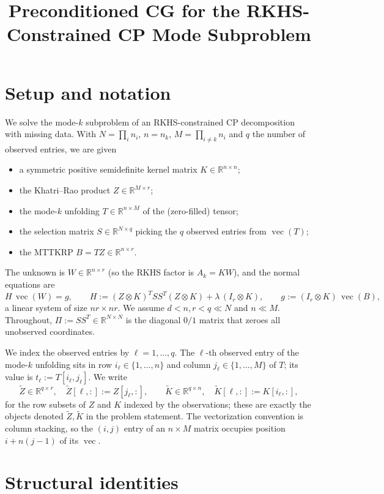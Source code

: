 \documentclass[12pt]{article}
\title{Preconditioned CG for the RKHS-Constrained CP Mode Subproblem}
\author{}
\date{}
\DeclareMathOperator{\vecop}{vec}
\newcommand{\bR}{\mathbb{R}}
\newcommand{\tZ}{\tilde Z}
\newcommand{\tK}{\tilde K}
\begin{document}
\maketitle

\section{Setup and notation}

We solve the mode-$k$ subproblem of an RKHS-constrained CP decomposition with
missing data. With $N=\prod_i n_i$, $n=n_k$, $M=\prod_{i\ne k}n_i$ and $q$ the
number of observed entries, we are given
\begin{itemize}[nosep]
\item a symmetric positive semidefinite kernel matrix $K\in\bR^{n\times n}$;
\item the Khatri--Rao product $Z\in\bR^{M\times r}$;
\item the mode-$k$ unfolding $T\in\bR^{n\times M}$ of the (zero-filled) tensor;
\item the selection matrix $S\in\bR^{N\times q}$ picking the $q$ observed entries
from $\vecop(T)$;
\item the MTTKRP $B=TZ\in\bR^{n\times r}$.
\end{itemize}
The unknown is $W\in\bR^{n\times r}$ (so the RKHS factor is $A_k=KW$), and the
normal equations are
\begin{equation}\label{eq:system}
  H\,\vecop(W)=g,\qquad
  H:=(Z\otimes K)^{T}SS^{T}(Z\otimes K)+\lambda\,(I_r\otimes K),\qquad
  g:=(I_r\otimes K)\,\vecop(B),
\end{equation}
a linear system of size $nr\times nr$. We assume $d<n,r<q\ll N$ and $n\ll M$.
Throughout, $\Pi:=SS^{T}\in\bR^{N\times N}$ is the diagonal $0/1$ matrix that zeroes
all unobserved coordinates.

We index the observed entries by $\ell=1,\dots,q$. The $\ell$-th observed entry of
the mode-$k$ unfolding sits in row $i_\ell\in\{1,\dots,n\}$ and column
$j_\ell\in\{1,\dots,M\}$ of $T$; its value is $t_\ell:=T[i_\ell,j_\ell]$. We write
\[
  \tZ\in\bR^{q\times r},\quad \tZ[\ell,:]:=Z[j_\ell,:],
  \qquad
  \tK\in\bR^{q\times n},\quad \tK[\ell,:]:=K[i_\ell,:],
\]
for the row subsets of $Z$ and $K$ indexed by the observations; these are exactly
the objects denoted $\tilde Z,\tilde K$ in the problem statement. The vectorization
convention is column stacking, so the $(i,j)$ entry of an $n\times M$ matrix occupies
position $i+n(j-1)$ of its $\vecop$.

\section{Structural identities}
\end{document}
